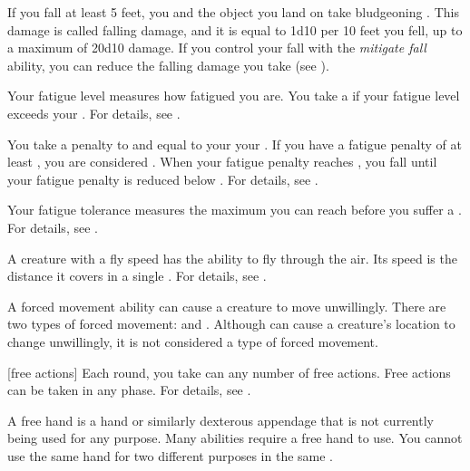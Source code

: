  If you fall at least 5 feet, you and the object you land on take bludgeoning .
This damage is called falling damage, and it is equal to 1d10 per 10 feet you fell, up to a maximum of 20d10 damage.
If you control your fall with the \textit{mitigate fall} ability, you can reduce the falling damage you take (see ).

 Your fatigue level measures how fatigued you are.
You take a  if your fatigue level exceeds your .
For details, see .

 You take a penalty to  and  equal to your  \sub your .
If you have a fatigue penalty of at least , you are considered .
When your fatigue penalty reaches , you fall \unconscious until your fatigue penalty is reduced below .
For details, see .

 Your fatigue tolerance measures the maximum  you can reach before you suffer a .
For details, see .

 A creature with a fly speed has the ability to fly through the air.
Its speed is the distance it covers in a single .
For details, see .

 A forced movement ability can cause a creature to move unwillingly.
There are two types of forced movement:  and .
Although  can cause a creature's location to change unwillingly, it is not considered a type of forced movement.

[free actions] Each round, you take can any number of free actions.
Free actions can be taken in any phase.
For details, see .

 A free hand is a hand or similarly dexterous appendage that is not currently being used for any purpose.
Many abilities require a free hand to use.
You cannot use the same hand for two different purposes in the same .

